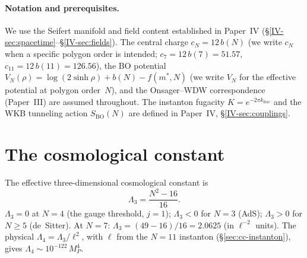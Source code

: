 \paragraph{Notation and prerequisites.}
We use the Seifert manifold and field content established in
Paper~IV (\S\ref*{IV-sec:spacetime}--\S\ref*{IV-sec:fields}).
The central charge $c_N = 12\,b(N)$
(we write $c_N$ when a specific polygon order is intended;
$c_7 = 12\,b(7) = 51.57$, $c_{11} = 12\,b(11) = 126.56$),
the BO potential
$V_N(\rho) = \log(2\sinh\rho) + b(N) - f(m^*,N)$
(we write $V_N$ for the effective potential at polygon order~$N$),
and the Onsager--WDW correspondence (Paper~III) are
assumed throughout.
The instanton fugacity $K = e^{-2\pi k_{\mathrm{frac}}}$
and the WKB tunneling action $S_{\mathrm{BO}}(N)$ are
defined in Paper~IV, \S\ref*{IV-sec:couplings}.

\section{The cosmological constant}
\label{sec:lambda}

\begin{proposition}
\label{prop:lambda}
The effective three-dimensional cosmological constant is
\begin{equation}\label{eq:lambda}
  \Lambda_3 = \frac{N^2 - 16}{16}.
\end{equation}
$\Lambda_3 = 0$ at $N = 4$ (the gauge threshold, $j = 1$);
$\Lambda_3 < 0$ for $N = 3$ (AdS);
$\Lambda_3 > 0$ for $N \ge 5$ (de~Sitter).
At $N = 7$: $\Lambda_3 = (49{-}16)/16 = 2.0625$ (in $\ell^{-2}$ units). The physical $\Lambda_4 = \Lambda_3/\ell^2$, with $\ell$ from the $N = 11$ instanton (\S\ref{sec:cc-instanton}), gives $\Lambda_4 \sim 10^{-122}\,M_P^4$.
\end{proposition}

